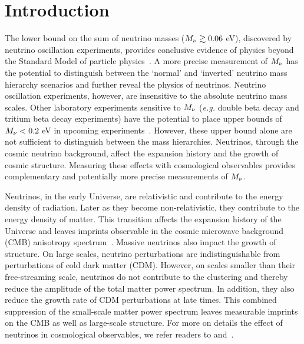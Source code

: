 \section{Introduction}
The lower bound on the sum of neutrino masses ($M_\nu \gtrsim 0.06$ eV), 
discovered by neutrino oscillation experiments, provides conclusive evidence of 
physics beyond the Standard Model of particle physics~\citep{forero2014, gonzalez-garcia2016}. 
A more precise measurement of $M_\nu$ has the potential to distinguish 
between the `normal' and `inverted' neutrino mass hierarchy scenarios 
and further reveal the physics of neutrinos. Neutrino oscillation 
experiments, however, are insensitive to the absolute neutrino mass scales. 
Other laboratory experiments sensitive to $M_\nu$ (\emph{e.g.} double beta 
decay and tritium beta decay experiments) have the potential to place upper 
bounds of $M_\nu < 0.2$ eV in upcoming experiments~\citep{bonn2011, drexlin2013}. 
However, these upper bound alone are not sufficient to distinguish between the mass
hierarchies. Neutrinos, through the cosmic neutrino background, affect the 
expansion history and the growth of cosmic structure. Measuring these effects 
with cosmological observables provides complementary and potentially more 
precise measurements of $M_\nu$. 

Neutrinos, in the early Universe, are relativistic and contribute to the 
energy density of radiation. Later as they become non-relativistic, 
they contribute to the energy density of matter. This transition affects 
the expansion history of the Universe and leaves imprints observable in 
the cosmic microwave background (CMB) anisotropy spectrum~\citep{lesgourgues2012, lesgourgues2014}. 
Massive neutrinos also impact the growth of structure. On large scales, 
neutrino perturbations are indistinguishable from perturbations of cold 
dark matter (CDM). However, on scales smaller than their free-streaming 
scale, neutrinos do not contribute to the clustering and thereby reduce 
the amplitude of the total matter power spectrum. In addition, they also reduce the growth 
rate of CDM perturbations at late times. This combined suppression of 
the small-scale matter power spectrum leaves measurable imprints 
on the CMB as well as large-scale structure. For more on details the effect
of neutrinos in cosmological observables, we refer readers to 
\cite{lesgourgues2012,lesgourgues2014} and~\cite{gerbino2018}. 


